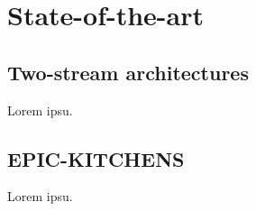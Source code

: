 \documentclass[12pt, a4paper]{report}
\begin{document}
	\chapter{State-of-the-art}
	\section{Two-stream architectures}\label{twostream}
	Lorem ipsu.

	\section{EPIC-KITCHENS}
	Lorem ipsu.

	
	
	\makeutbmbackcover{}
\end{document}

